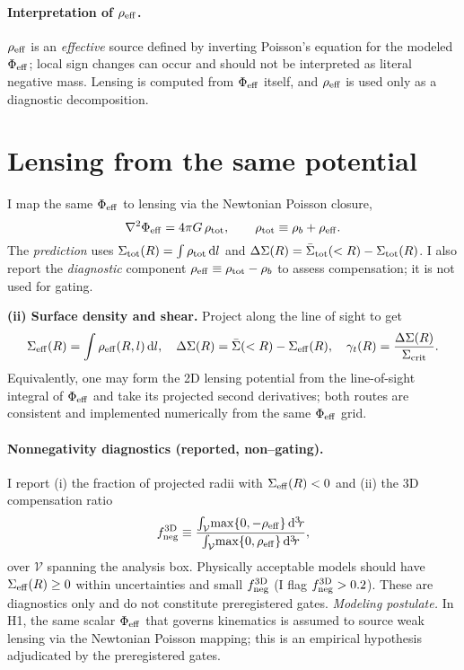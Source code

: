 		\paragraph{Interpretation of $\rho_{\rm eff}$.}
		$\rho_{\rm eff}$ is an \emph{effective} source defined by inverting Poisson’s equation for the modeled $\Phi_{\rm eff}$; local sign changes can occur and should not be interpreted as literal negative mass. Lensing is computed from $\Phi_{\rm eff}$ itself, and $\rho_{\rm eff}$ is used only as a diagnostic decomposition.
		
		\section{Lensing from the same potential}\label{app:lensing}
I map the same $\Phi_{\rm eff}$ to lensing via the Newtonian Poisson closure,
\[
\nabla^2\Phi_{\rm eff}=4\pi G\,\rho_{\rm tot},\qquad
\rho_{\rm tot}\equiv\rho_b+\rho_{\rm eff}.
\]
The \emph{prediction} uses $\Sigma_{\rm tot}(R)=\int \rho_{\rm tot}\,{\rm d}l$ and 
$\Delta\Sigma(R)=\bar{\Sigma}_{\rm tot}(<R)-\Sigma_{\rm tot}(R)$.
I also report the \emph{diagnostic} component $\rho_{\rm eff}\equiv\rho_{\rm tot}-\rho_b$ to assess compensation; it is not used for gating.

		
		\textbf{(ii) Surface density and shear.} Project along the line of sight to get
		\[
		\Sigma_{\rm eff}(R)=\int \rho_{\rm eff}(R,l)\,\mathrm{d} l,\quad
		\Delta\Sigma(R)=\bar{\Sigma}(<R)-\Sigma_{\rm eff}(R),\quad
		\gamma_t(R)=\frac{\Delta\Sigma(R)}{\Sigma_{\rm crit}}.
		\]
		Equivalently, one may form the 2D lensing potential from the line-of-sight integral of $\Phi_{\mathrm{eff}}$ and take its projected second derivatives; both routes are consistent and implemented numerically from the same $\Phi_{\mathrm{eff}}$ grid.
\paragraph{Nonnegativity diagnostics (reported, non--gating).}
I report (i) the fraction of projected radii with $\Sigma_{\rm eff}(R)<0$ and (ii) the 3D compensation ratio
\[
f_{\rm neg}^{\rm 3D} \equiv \frac{\int_{\mathcal V}\!\max\{0,-\rho_{\rm eff}\}\,{\rm d}^3\!r}
{\int_{\mathcal V}\!\max\{0,\rho_{\rm eff}\}\,{\rm d}^3\!r},
\]
over $\mathcal V$ spanning the analysis box. Physically acceptable models should have $\Sigma_{\rm eff}(R)\ge 0$ within uncertainties and small $f_{\rm neg}^{\rm 3D}$ (I flag $f_{\rm neg}^{\rm 3D}>0.2$). These are diagnostics only and do not constitute preregistered gates.
\noindent\textit{Modeling postulate.} In H1, the same scalar $\Phi_{\rm eff}$ that governs kinematics is assumed to source weak lensing via the Newtonian Poisson mapping; this is an empirical hypothesis adjudicated by the preregistered gates.

